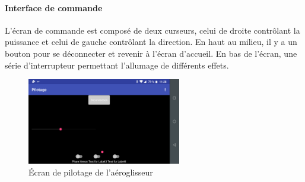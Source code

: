 			\paragraph{Interface de commande} L'écran de commande est composé de deux curseurs, celui de droite contrôlant la puissance et celui de gauche contrôlant la direction. En haut au milieu, il y a un bouton pour se déconnecter et revenir à l'écran d'accueil. En bas de l'écran, une série d'interrupteur permettant l'allumage de différents effets.
			\begin{figure}
		\begin{center}
			\includegraphics[width=0.6\textwidth]{../Illus/AppPilotage.png}
		\end{center}
			\caption{Écran de pilotage de l'aéroglisseur}
		\end{figure}
